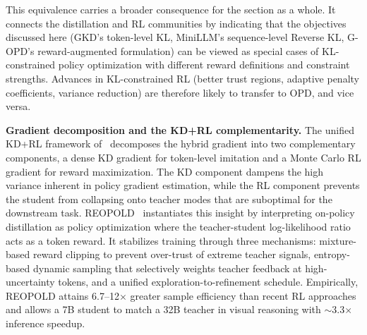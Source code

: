 \documentclass{article} %
\begin{document}
This equivalence carries a broader consequence for the section as a whole. It connects the distillation and RL communities by indicating that the objectives discussed here (GKD's token-level KL, MiniLLM's sequence-level Reverse KL, G-OPD's reward-augmented formulation) can be viewed as special cases of KL-constrained policy optimization with different reward definitions and constraint strengths. Advances in KL-constrained RL (better trust regions, adaptive penalty coefficients, variance reduction) are therefore likely to transfer to OPD, and vice versa.

\textbf{Gradient decomposition and the KD+RL complementarity.} The unified KD+RL framework of~\citet{2512.23097} decomposes the hybrid gradient into two complementary components, a dense KD gradient for token-level imitation and a Monte Carlo RL gradient for reward maximization. The KD component dampens the high variance inherent in policy gradient estimation, while the RL component prevents the student from collapsing onto teacher modes that are suboptimal for the downstream task. REOPOLD~\citep{2603.11137} instantiates this insight by interpreting on-policy distillation as policy optimization where the teacher-student log-likelihood ratio acts as a token reward. It stabilizes training through three mechanisms: mixture-based reward clipping to prevent over-trust of extreme teacher signals, entropy-based dynamic sampling that selectively weights teacher feedback at high-uncertainty tokens, and a unified exploration-to-refinement schedule. Empirically, REOPOLD attains 6.7--12$\times$ greater sample efficiency than recent RL approaches and allows a 7B student to match a 32B teacher in visual reasoning with $\sim$3.3$\times$ inference speedup.
\end{document}
